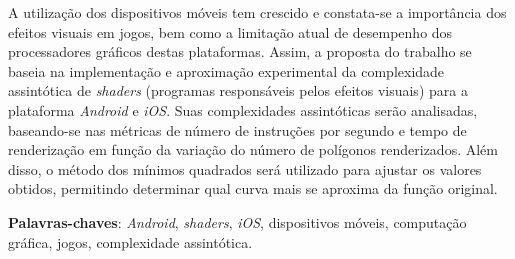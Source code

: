 \begin{resumo}

 A utilização dos dispositivos móveis tem crescido e constata-se a importância dos efeitos visuais em jogos, bem como a limitação atual de desempenho dos processadores gráficos destas plataformas. Assim, a proposta do trabalho se baseia na implementação e aproximação experimental da complexidade assintótica de \textit{shaders} (programas responsáveis pelos efeitos visuais) para a plataforma \textit{Android} e \textit{iOS}. Suas complexidades assintóticas serão analisadas, baseando-se nas métricas de número de instruções por segundo e tempo de renderização em função da variação do número de polígonos renderizados. Além disso, o método dos mínimos quadrados será utilizado para ajustar os valores obtidos, permitindo determinar qual curva mais se aproxima da função original.

 \vspace{\onelineskip}
    
 \noindent
 \textbf{Palavras-chaves}: \textit{Android}, \textit{shaders}, \textit{iOS}, dispositivos móveis, computação gráfica, jogos, complexidade assintótica. 
\end{resumo}
